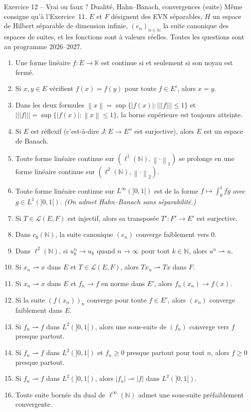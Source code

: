 \documentclass[11pt,a4paper]{article}
\newcommand{\N}{\mathbb{N}}
\newcommand{\K}{\mathbb{K}}
\newcommand{\norm}[1]{\left\|#1\right\|}
\newcommand{\opnorm}[1]{|\!|\!|#1|\!|\!|}
\newcommand{\Lc}{\mathcal{L}}
\newcommand{\ie}{c'est-à-dire}
\newcommand{\wk}{\rightharpoonup}
\theoremstyle{definition}
\begin{document}
\begin{exo}{Exercice 12 -- Vrai ou faux ? Dualité, Hahn--Banach, convergences (suite)}
Même consigne qu'à l'Exercice~11. $E$ et $F$ désignent des EVN séparables, $H$ un espace de Hilbert séparable de dimension infinie, $(e_n)_{n\in\N}$ la suite canonique des espaces de suites, et les fonctions sont à valeurs réelles. Toutes les questions sont au programme 2026--2027.
\begin{enumerate}[label=\arabic*.]
  \item Une forme linéaire $f:E\to\K$ est continue si et seulement si son noyau est fermé.
  \item Si $x,y\in E$ vérifient $f(x)=f(y)$ pour toute $f\in E'$, alors $x=y$.
  \item Dans les deux formules $\norm x=\sup\{|f(x)|:\opnorm f\le1\}$ et $\opnorm f=\sup\{|f(x)|:\norm x\le1\}$, la borne supérieure est toujours atteinte.
  \item Si $E$ est réflexif (\ie{} $J:E\to E''$ est surjective), alors $E$ est un espace de Banach.
  \item Toute forme linéaire continue sur $(\ell^1(\N),\norm\cdot_1)$ se prolonge en une forme linéaire continue sur $(\ell^2(\N),\norm\cdot_2)$.
  \item Toute forme linéaire continue sur $L^\infty(]0,1[)$ est de la forme $f\mapsto\int_0^1fg$ avec $g\in L^1(]0,1[)$. \emph{(On admet Hahn--Banach sans séparabilité.)}
  \item Si $T\in\Lc(E,F)$ est injectif, alors sa transposée $T':F'\to E'$ est surjective.
  \item Dans $c_0(\N)$, la suite canonique $(e_n)$ converge faiblement vers $0$.
  \item Dans $\ell^2(\N)$, si $u^n_k\to u_k$ quand $n\to\infty$ pour tout $k\in\N$, alors $u^n\wk u$.
  \item Si $x_n\wk x$ dans $E$ et $T\in\Lc(E,F)$, alors $Tx_n\wk Tx$ dans $F$.
  \item Si $x_n\wk x$ dans $E$ et $f_n\to f$ en norme dans $E'$, alors $f_n(x_n)\to f(x)$.
  \item Si la suite $(f(x_n))_n$ converge pour toute $f\in E'$, alors $(x_n)$ converge faiblement dans $E$.
  \item Si $f_n\wk f$ dans $L^2(]0,1[)$, alors une sous-suite de $(f_n)$ converge vers $f$ presque partout.
  \item Si $f_n\wk f$ dans $L^2(]0,1[)$ et $f_n\ge0$ presque partout pour tout $n$, alors $f\ge0$ presque partout.
  \item Si $f_n\wk f$ dans $L^2(]0,1[)$, alors $|f_n|\wk|f|$ dans $L^2(]0,1[)$.
  \item Toute suite bornée du dual de $\ell^\infty(\N)$ admet une sous-suite préfaiblement convergente.
\end{enumerate}
\end{exo}
\end{document}

